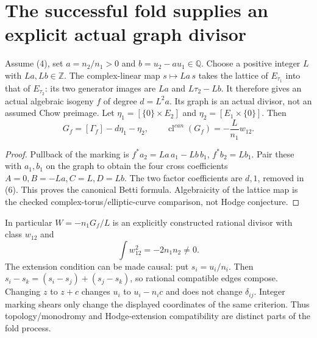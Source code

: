 \documentclass[11pt]{article}
\newcommand{\Q}{\mathbb Q}
\begin{document}
\section{The successful fold supplies an explicit actual graph divisor}
Assume (4), set $a=n_2/n_1>0$ and $b=u_2-a u_1\in\Q$. Choose a positive
integer $L$ with $La,Lb\in\mathbb Z$. The complex-linear map
$s\mapsto La\,s$ takes the lattice of $E_{\tau_1}$ into that of
$E_{\tau_2}$: its two generator images are $La$ and
$L\tau_2-Lb$. It therefore gives an actual algebraic isogeny $f$ of
degree $d=L^2a$. Its graph is an actual divisor, not an assumed Chow
preimage. Let $\eta_1=[\{0\}\times E_2]$ and
$\eta_2=[E_1\times\{0\}]$. Then
\[
 G_f=[\Gamma_f]-d\eta_1-\eta_2,\qquad
 \operatorname{cl}^{can}(G_f)=-\frac L{n_1}w_{12}.\tag{6}
\]
\begin{proof}
Pullback of the marking is $f^*a_2=La\,a_1-Lb\,b_1$,
$f^*b_2=L b_1$. Pair these with $a_1,b_1$ on the graph to obtain
the four cross coefficients $A=0,B=-La,C=L,D=Lb$.
The two factor coefficients are $d,1$, removed in (6). This proves
the canonical Betti formula. Algebraicity of the lattice map is the
checked complex-torus/elliptic-curve comparison, not Hodge conjecture.
\end{proof}
In particular $W=-n_1G_f/L$ is an explicitly constructed rational
divisor with class $w_{12}$ and
\[
 \int w_{12}^2=-2n_1n_2\ne0.\tag{7}
\]
The extension condition can be made causal: put $s_i=u_i/n_i$.
Then $s_i-s_k=(s_i-s_j)+(s_j-s_k)$, so rational compatible edges
compose. Changing $z$ to $z+c$ changes $u_i$ to $u_i-n_i c$ and
does not change $\delta_{ij}$. Integer marking shears only change the
displayed coordinates of the same criterion. Thus topology/monodromy
and Hodge-extension compatibility are distinct parts of the fold process.
\end{document}
